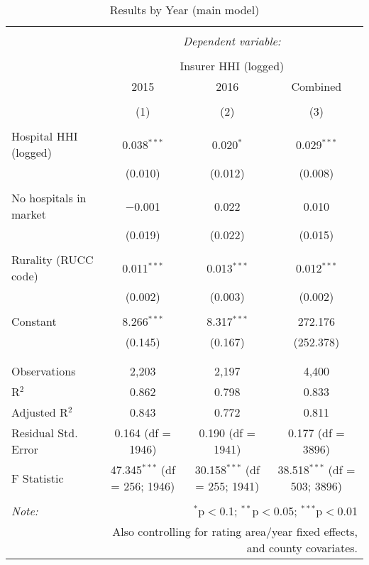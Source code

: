 
\begin{table}[!htbp] \centering 
  \caption{Results by Year (main model)} 
  \label{} 
\scriptsize 
\begin{tabular}{@{\extracolsep{5pt}}lccc} 
\\[-1.8ex]\hline 
\hline \\[-1.8ex] 
 & \multicolumn{3}{c}{\textit{Dependent variable:}} \\ 
\cline{2-4} 
\\[-1.8ex] & \multicolumn{3}{c}{Insurer HHI (logged)} \\ 
 & 2015 & 2016 & Combined \\ 
\\[-1.8ex] & (1) & (2) & (3)\\ 
\hline \\[-1.8ex] 
 Hospital HHI (logged) & 0.038$^{***}$ & 0.020$^{*}$ & 0.029$^{***}$ \\ 
  & (0.010) & (0.012) & (0.008) \\ 
  & & & \\ 
 No hospitals in market & $-$0.001 & 0.022 & 0.010 \\ 
  & (0.019) & (0.022) & (0.015) \\ 
  & & & \\ 
 Rurality (RUCC code) & 0.011$^{***}$ & 0.013$^{***}$ & 0.012$^{***}$ \\ 
  & (0.002) & (0.003) & (0.002) \\ 
  & & & \\ 
 Constant & 8.266$^{***}$ & 8.317$^{***}$ & 272.176 \\ 
  & (0.145) & (0.167) & (252.378) \\ 
  & & & \\ 
\hline \\[-1.8ex] 
Observations & 2,203 & 2,197 & 4,400 \\ 
R$^{2}$ & 0.862 & 0.798 & 0.833 \\ 
Adjusted R$^{2}$ & 0.843 & 0.772 & 0.811 \\ 
Residual Std. Error & 0.164 (df = 1946) & 0.190 (df = 1941) & 0.177 (df = 3896) \\ 
F Statistic & 47.345$^{***}$ (df = 256; 1946) & 30.158$^{***}$ (df = 255; 1941) & 38.518$^{***}$ (df = 503; 3896) \\ 
\hline 
\hline \\[-1.8ex] 
\textit{Note:}  & \multicolumn{3}{r}{$^{*}$p$<$0.1; $^{**}$p$<$0.05; $^{***}$p$<$0.01} \\ 
 & \multicolumn{3}{r}{Also controlling for rating area/year fixed effects, and county covariates.} \\ 
\end{tabular} 
\end{table} 
